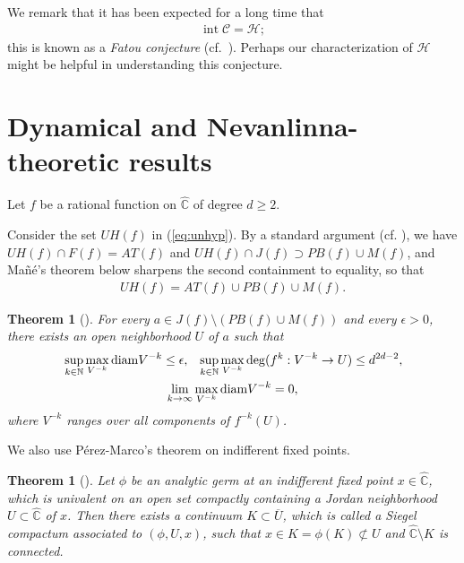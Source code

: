 \documentclass[a4paper,12pt]{amsart}
\theoremstyle{plain}
\newtheorem{theorem}[equation]{Theorem}
\theoremstyle{definition}
\theoremstyle{remark}
\numberwithin{equation}{section}
\begin{document}
We remark that it has been expected for a long time that
\begin{gather*}
 {\operatorname{int}}\mathcal{C}=\mathcal{H};\label{eq:complexFatou}
\end{gather*} 
this is known as a {\itshape Fatou conjecture}
(cf.\ \cite[p.\ 58]{McMullen:renorm}).
Perhaps our characterization of $\mathcal{H}$
might be helpful in understanding this conjecture.

\section{Dynamical and Nevanlinna-theoretic results}\label{sec:nevan}
Let $f$ be a rational function on ${\hat{\mathbb{C}}}$ of degree $d\ge 2$.

{\smallskip {}\nopagebreak[4]}
Consider the set ${\mathit{UH}}(f)$ in (\ref{eq:unhyp}).
By a standard argument (cf. \cite[\S 2]{DOproximity}), we have
${\mathit{UH}}(f)\cap F(f)={\mathit{AT}}(f)$ and ${\mathit{UH}}(f)\cap J(f)\supset {\mathit{PB}}(f)\cup M(f)$,
and Ma\~n\'e's theorem below sharpens the second containment to equality, so that
\begin{gather*}
 {\mathit{UH}}(f)={\mathit{AT}}(f)\cup{\mathit{PB}}(f)\cup M(f).
\end{gather*}

\begin{theorem}[{\cite[Theorem II]{Mane93}}]\label{th:recurrent}
 For every $a\in J(f)\setminus({\mathit{PB}}(f)\cup M(f))$
 and every $\epsilon>0$, there exists an open neighborhood $U$ of $a$ such that
 \begin{gather}
  \begin{aligned}
   &\sup_{k\in{\mathbb{N}}}\max_{V^{-k}}{\operatorname{diam}} V^{-k}\le\epsilon,
   &\sup_{k\in{\mathbb{N}}}\max_{V^{-k}}\deg(f^k:V^{-k}\to U)\le d^{2d-2},
  \end{aligned}\notag\\
  \begin{gathered}
   \lim_{k\to\infty}\max_{V^{-k}}{\operatorname{diam}} V^{-k}=0,\label{eq:schrink}
  \end{gathered}
 \end{gather}
where $V^{-k}$ ranges over all components of $f^{-k}(U)$.
\end{theorem}

We also use P\'erez-Marco's theorem on indifferent fixed points. 

\begin{theorem}[{\cite[Theorem 1]{PM97}}]\label{th:hedgehog}
 Let $\phi$ be an analytic germ at an indifferent fixed point $x\in{\hat{\mathbb{C}}}$,
 which is univalent on an open set compactly containing
 a Jordan neighborhood $U\subset{\hat{\mathbb{C}}}$ of $x$.
 Then there exists a continuum $K\subset\overline{U}$,
 which is called a Siegel compactum associated to $(\phi,U,x)$,
 such that $x\in K=\phi(K)\not\subset U$ and ${\hat{\mathbb{C}}}\setminus K$ is connected.
\end{theorem}
\end{document}

